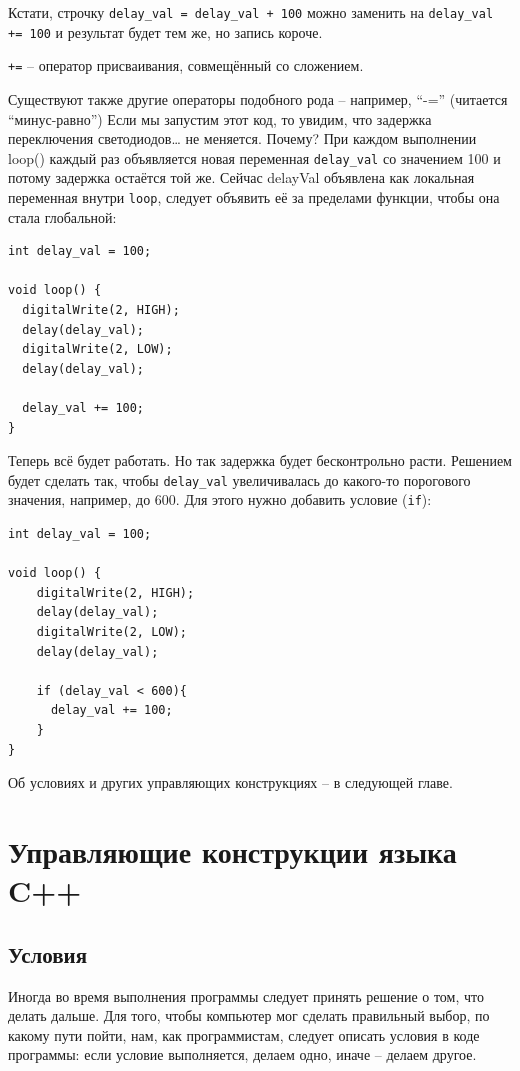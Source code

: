 \documentclass[a4paper,twoside]{book}
\begin{document}
Кстати, строчку \texttt{delay\_val = delay\_val + 100} можно заменить на
\texttt{delay\_val += 100} и результат будет тем же, но запись короче.

\texttt{+=} -- оператор присваивания, совмещённый со сложением.

Существуют также другие операторы подобного рода -- например, ``-=''
(читается ``минус-равно'') Если мы запустим этот код, то увидим, что задержка
переключения светодиодов… не меняется. Почему? При каждом выполнении loop()
каждый раз объявляется новая переменная \texttt{delay\_val} со значением 100 и
потому задержка остаётся той же. Сейчас delayVal объявлена как локальная
переменная внутри \texttt{loop}, следует объявить её за пределами функции, чтобы
она стала глобальной:

\begin{verbatim}
int delay_val = 100;

void loop() {
  digitalWrite(2, HIGH);
  delay(delay_val);
  digitalWrite(2, LOW);
  delay(delay_val);

  delay_val += 100;
}
\end{verbatim}

Теперь всё будет работать. Но так задержка будет бесконтрольно расти. Решением
будет сделать так, чтобы \texttt{delay\_val} увеличивалась до какого-то
порогового значения, например, до 600. Для этого нужно добавить условие
(\texttt{if}):

\begin{verbatim}
int delay_val = 100;

void loop() {
    digitalWrite(2, HIGH);
    delay(delay_val);
    digitalWrite(2, LOW);
    delay(delay_val);

    if (delay_val < 600){
      delay_val += 100;
    }
}
\end{verbatim}

Об условиях и других управляющих конструкциях -- в следующей главе.

\chapter{Управляющие конструкции языка C++}

\section{Условия}

Иногда во время выполнения программы следует принять решение о том, что делать
дальше. Для того, чтобы компьютер мог сделать правильный выбор, по какому пути
пойти, нам, как программистам, следует описать условия в коде программы: если
условие выполняется, делаем одно, иначе -- делаем другое.
\end{document}
